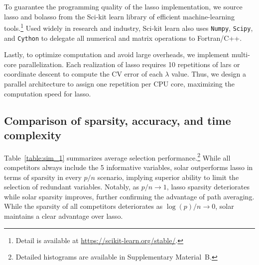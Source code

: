 \documentclass[11pt,review,authoryear]{elsarticle}
\begin{document}
To guarantee the programming quality of the lasso implementation, we source lasso and bolasso from the Sci-kit learn library \citep{scikit-learn} of efficient machine-learning tools.\footnote{Detail is available at \url{https://scikit-learn.org/stable/}.} Used widely in research and industry, Sci-kit learn also uses \texttt{Numpy}, \texttt{Scipy}, and \texttt{Cython} to delegate all numerical and matrix operations to Fortran/C++.

Lastly, to optimize computation and avoid large overheads, we implement multi-core parallelization. Each realization of lasso requires 10 repetitions of lars or coordinate descent to compute the CV error of each $\lambda$ value. Thus, we design a parallel architecture to assign one repetition per CPU core, maximizing the computation speed for lasso.

\subsection{Comparison of sparsity, accuracy, and time complexity \label{subsection:suml1}}

Table~\ref{table:sim_1} summarizes average selection performance.\footnote{Detailed histograms are available in Supplementary Material~B.} While all competitors always include the 5 informative variables, solar outperforms lasso in terms of sparsity in every $p/n$ scenario, implying superior ability to limit the selection of redundant variables. Notably, as $p/n\rightarrow1$, lasso sparsity deteriorates while solar sparsity improves, further confirming the advantage of path averaging. While the sparsity of all competitors deteriorates as $\log(p)/n\rightarrow0$, solar maintains a clear advantage over lasso.
\end{document}

